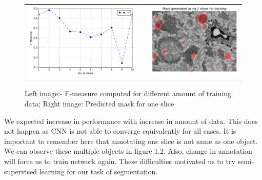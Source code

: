 \begin{figure}[h!]\label{fig:cnnslices}
\begin{tabular}{cc}
 \includegraphics[width=0.5\linewidth]{figures/cnn_diff_slices.pdf} & \includegraphics[width=0.5\linewidth]{figures/cnn_mask_2slice.pdf} \\
\end{tabular}
\caption{Left image:- F-measure computed for different amount of training data; Right image: Predicted mask for one slice}
\end{figure}
We expected increase in performance with increase in amount of data. This does not happen as CNN is not able to converge equivalently for all cases. It is important to remember here that annotating one slice is not same as one object. We can observe these multiple objects in figure 1.2. Also, change in annotation will force us to train network again. These difficulties motivated us to try semi-supervised learning for our task of segmentation.
